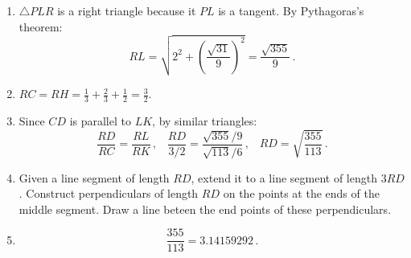 \begin{enumerate}
\item $\triangle PLR$ is a right triangle because it $PL$ is a tangent. By Pythagoras's theorem:
\[
RL=\sqrt{2^2+\left(\frac{\sqrt{31}}{9}\right)^2} = \frac{\sqrt{355}}{9}\,.
\]

\item $RC=RH=\displaystyle\frac{1}{3}+\frac{2}{3}+\frac{1}{2}=\frac{3}{2}$.

\item Since $CD$ is parallel to $LK$, by similar triangles:
\[
\frac{RD}{RC}=\frac{RL}{RK}\,,\;\;\;\frac{RD}{3/2}=\frac{\sqrt{355}/9}{\sqrt{113}/6}\,,\;\;\;RD=\sqrt{\frac{355}{113}}\,.
\]

\item Given a line segment of length $RD$, extend it to a line segment of length $3RD$. Construct perpendiculars of length $RD$ on the points at the ends of the middle segment. Draw a line beteen the end points of these perpendiculars.

\begin{center}
\end{center}

\item \mbox{}
\[
\frac{355}{113}=3.14159292\,.
\]

\end{enumerate}

